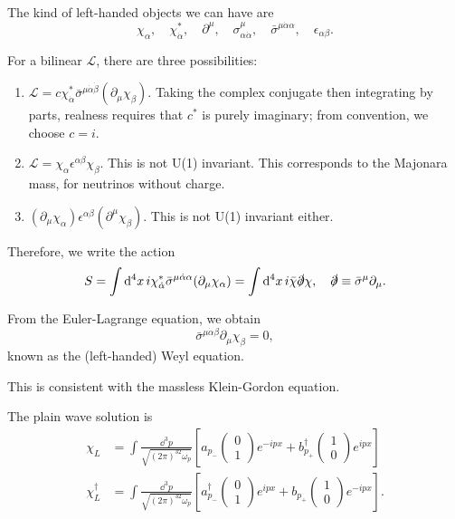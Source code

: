 \documentclass{article}
\begin{document}
The kind of left-handed objects we can have are 
$$\chi_\alpha,\quad\chi^*_{\dot\alpha},\quad\partial^\mu,\quad\sigma^\mu_{\alpha\dot\alpha},\quad\bar\sigma^{\mu\dot\alpha\alpha},\quad\epsilon_{\alpha\beta}.$$

For a bilinear $\mathcal L$, there are three possibilities:
\begin{enumerate}
    \item $\mathcal L=c\chi^*_{\dot\alpha}\bar\sigma^{\mu\dot\alpha\dot\beta}(\partial_\mu\chi_\beta)$. Taking the complex conjugate then integrating by parts, realness requires that $c^*$ is purely imaginary; from convention, we choose $c=i$.
    \item $\mathcal L=\chi_\alpha\epsilon^{\alpha\beta}\chi_\beta$. This is not U(1) invariant. This corresponds to the Majonara mass, for neutrinos without charge.
    \item $(\partial_\mu\chi_\alpha)\epsilon^{\alpha\beta}(\partial^\mu\chi_\beta)$. This is not U(1) invariant either.
\end{enumerate}
Therefore, we write the action
\begin{equation}
    S=\int\dd^4x\,i\chi^*_{\dot\alpha}\bar\sigma^{\mu\dot\alpha\alpha}(\partial_\mu\chi_\alpha)=\int\dd^4x\,i\bar\chi\slashed\partial\chi,\quad\slashed\partial\equiv\bar\sigma^\mu\partial_\mu.
\end{equation}

From the Euler-Lagrange equation, we obtain
\begin{equation}
    \bar\sigma^{\mu\dot\alpha\beta}\partial_\mu\chi_\beta=0,
\end{equation}
known as the (left-handed) Weyl equation.

This is consistent with the massless Klein-Gordon equation. 

The plain wave solution is 
\begin{align*}
    \chi_L&=\int\frac{\dd^3p}{\sqrt{(2\pi)^32\omega_p}}\left[a_{p_-}\begin{pmatrix}0\\1\end{pmatrix}e^{-ipx}+b^\dag_{p_+}\begin{pmatrix}1\\0\end{pmatrix}e^{ipx}\right]\\
    \chi_L^\dag&=\int\frac{\dd^3p}{\sqrt{(2\pi)^32\omega_p}}\left[a^\dag_{p_-}\begin{pmatrix}0\\1\end{pmatrix}e^{ipx}+b_{p_+}\begin{pmatrix}1\\0\end{pmatrix}e^{-ipx}\right].
\end{align*}
\end{document}

